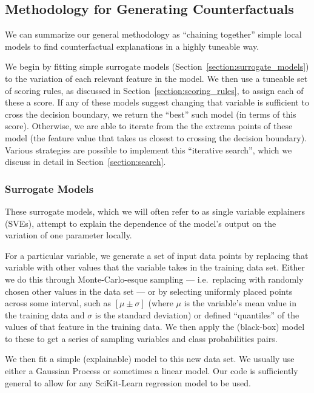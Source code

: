 \documentclass{article}
\begin{document}
\subsection{Methodology for Generating Counterfactuals}
We can summarize our general methodology as ``chaining together'' simple local models to find counterfactual explanations in a highly tuneable way.

We begin by fitting simple surrogate models (Section~\ref{section:surrogate_models}) to the variation of each relevant feature in the model. We then use a tuneable set of scoring rules, as discussed in Section~\ref{section:scoring_rules}, to assign each of these a score. If any of these models suggest changing that variable is sufficient to cross the decision boundary, we return the ``best'' such model (in terms of this score). Otherwise, we are able to iterate from the the extrema points of these model (the feature value that takes us closest to crossing the decision boundary). Various strategies are possible to implement this ``iterative search'', which we discuss in detail in Section~\ref{section:search}.


\subsubsection{Surrogate Models\label{section:surrogate_models}}
These surrogate models, which we will often refer to as single variable explainers (SVEs), attempt to explain the dependence of the model's output on the variation of one parameter locally. 

For a particular variable, we generate a set of input data points by replacing that variable with other values that the variable takes in the training data set. Either we do this through Monte-Carlo-esque sampling --- i.e.\ replacing with randomly chosen other values in the data set --- or by selecting uniformly placed points across some interval, such as \(\left[\mu \pm \sigma \right]\) (where \(\mu\) is the variable's mean value in the training data and \(\sigma\) is the standard deviation) or defined ``quantiles'' of the values of that feature in the training data. We then apply the (black-box) model to these to get a series of sampling variables and class probabilities pairs. 

We then fit a simple (explainable) model to this new data set. We usually use either a Gaussian Process or sometimes a linear model. Our code is sufficiently general to allow for any SciKit-Learn regression model to be used. 
\end{document}
